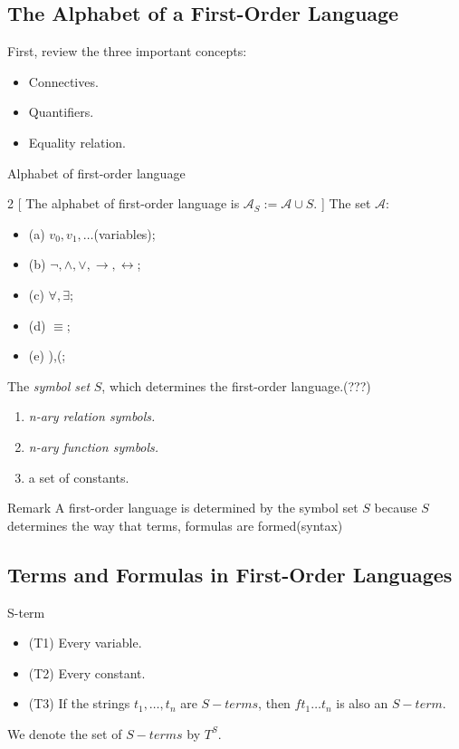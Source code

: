 \documentclass{article}
\newcommand{\page}[1]{\linkout{book_Ebbinghaus}{#1}}
\begin{document}
\subsection{The Alphabet of a First-Order Language}
First, review the three important concepts:
\begin{itemize}
    \item Connectives.
    \item Quantifiers.
    \item Equality relation.
\end{itemize}

\begin{definition}{Alphabet of first-order language}
\begin{multicols}{2}
    [
        The alphabet of first-order language is $\mathcal{A}_S := \mathcal{A} \cup S$.
    ]
    The set $\mathcal{A}$:
    \begin{itemize}
        \item (a) $v_0, v_1,\dots$(variables);
        \item (b) $\lnot, \land, \lor, \rightarrow, \leftrightarrow$;
        \item (c) $\forall, \exists$;
        \item (d) $\equiv$;
        \item (e) ),(;
    \end{itemize}
\columnbreak
    The {\color{red}\it symbol set} $S$, which determines the first-order language.(???)
    \begin{enumerate}
        \item {\it n-ary relation symbols.}
        \item {\it n-ary function symbols.}
        \item a set of constants.
    \end{enumerate}
\end{multicols}
\begin{freebox}{Remark}
    A first-order language is determined by the symbol set $S$ because {\color{green} $S$ determines the way that terms, formulas are formed(syntax)}
\end{freebox}

\end{definition}

\subsection{Terms and Formulas in First-Order Languages}

\begin{definition}{S-term \page{23}}
    \begin{itemize}
        \item (T1) Every variable.
        \item (T2) Every constant.
        \item (T3) If the strings $t_1,\dots,t_n$ are $S-terms$, then $ft_1 \dots t_n$ is also an $S-term$.
    \end{itemize}
    We denote the set of $S-terms$ by $T^S$.
\end{definition}
\end{document}
